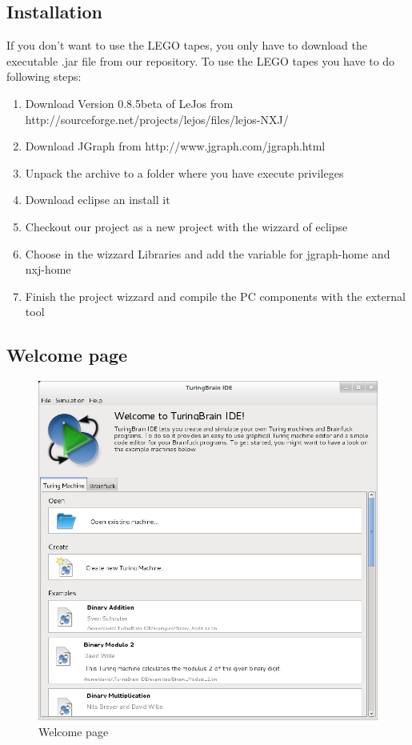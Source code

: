 \documentclass[%
  a4paper,%
  11pt,%
  blue,%
  hyperref	%
  ]{tubsartcl}
\begin{document}
\subsection{Installation}
\label{sec:installation}
If you don't want to use the LEGO tapes, you only have to download the executable .jar file from our repository.
To use the LEGO tapes you have to do following steps:
\begin{enumerate}
	\item Download Version 0.8.5beta of LeJos from http://sourceforge.net/projects/lejos/files/lejos-NXJ/
	\item Download JGraph from http://www.jgraph.com/jgraph.html
	\item Unpack the archive to a folder where you have execute privileges
	\item Download eclipse an install it
	\item Checkout our project as a new project with the wizzard of eclipse
	\item Choose in the wizzard Libraries and add the variable for jgraph-home and nxj-home
	\item Finish the project wizzard and compile the PC components with the external tool
\end{enumerate}


\newpage

\subsection{Welcome page}
\label{sec:welcome-page}

\begin{figure}[!htb]
\begin{center}
\includegraphics[scale=0.45]{graphics_gui/welcomescreen.png}
\end{center}
\caption{Welcome page}
\label{pic:welcome_page}
\end{figure}
\end{document}
